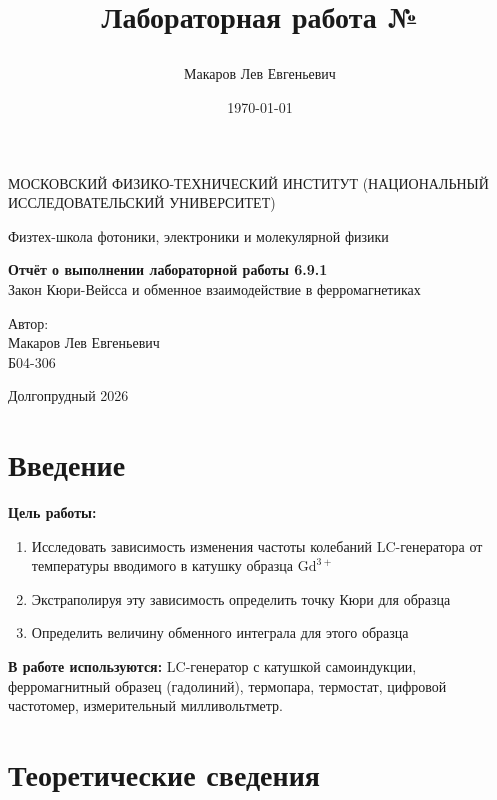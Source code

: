 \documentclass[a4paper,12pt]{article}
\author{Макаров Лев Евгеньевич}
\title{Лабораторная работа №\labnumber

\labname
}
\date{\today}
\newcommand\labname{Закон Кюри-Вейсса и обменное взаимодействие в ферромагнетиках}
\newcommand\labnumber{6.9.1}
\begin{document}
\begin{titlepage}
	\begin{center}
		{\large МОСКОВСКИЙ ФИЗИКО-ТЕХНИЧЕСКИЙ ИНСТИТУТ (НАЦИОНАЛЬНЫЙ ИССЛЕДОВАТЕЛЬСКИЙ УНИВЕРСИТЕТ)}
	\end{center}
	\begin{center}
		{\large Физтех-школа фотоники, электроники и молекулярной физики}
	\end{center}
	
	
	\vspace{4.5cm}
	{\huge
		\begin{center}
			{\bf Отчёт о выполнении лабораторной работы \labnumber}\\
			\labname
		\end{center}
	}
	\vspace{2cm}
	\begin{flushright}
		{\LARGE Автор:\\ Макаров Лев Евгеньевич \\
			\vspace{0.2cm}
			Б04-306}
	\end{flushright}
	\vspace{8cm}
	\begin{center}
		Долгопрудный 2026
	\end{center}
\end{titlepage}

\section{Введение}


\textbf{Цель работы:} 
\begin{enumerate}
	\item Исследовать зависимость изменения частоты колебаний LC-генератора от температуры вводимого в катушку образца $\text{Gd}^{3+}$
    \item Экстраполируя эту зависимость определить точку Кюри для образца
    \item Определить величину обменного интеграла для этого образца
\end{enumerate}

\textbf{В работе используются:} LC-генератор с катушкой самоиндукции, ферромагнитный образец (гадолиний), термопара, термостат, цифровой частотомер, измерительный милливольтметр.

\section{Теоретические сведения}
\end{document}
